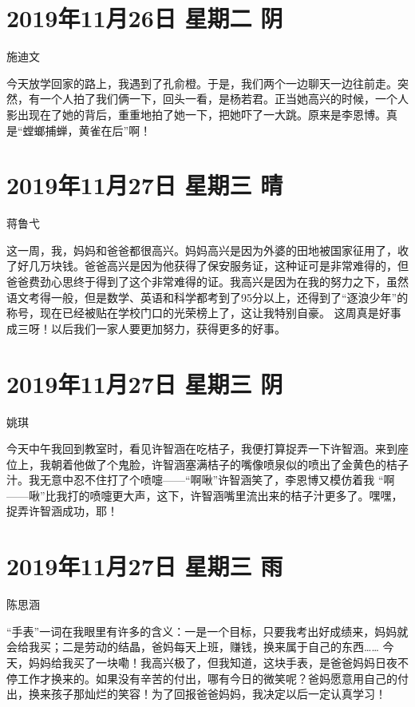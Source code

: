 \section{2019年11月26日 星期二 阴}

施迪文

今天放学回家的路上，我遇到了孔俞橙。于是，我们两个一边聊天一边往前走。突然，有一个人拍了我们俩一下，回头一看，是杨若君。正当她高兴的时候，一个人影出现在了她的背后，重重地拍了她一下，把她吓了一大跳。原来是李恩博。真是“螳螂捕蝉，黄雀在后”啊！

\section{2019年11月27日 星期三 晴}

蒋鲁弋

这一周，我，妈妈和爸爸都很高兴。妈妈高兴是因为外婆的田地被国家征用了，收了好几万块钱。爸爸高兴是因为他获得了保安服务证，这种证可是非常难得的，但爸爸费劲心思终于得到了这个非常难得的证。我高兴是因为在我的努力之下，虽然语文考得一般，但是数学、英语和科学都考到了95分以上，还得到了“逐浪少年”的称号，现在已经被贴在学校门口的光荣榜上了，这让我特别自豪。
这周真是好事成三呀！以后我们一家人要更加努力，获得更多的好事。

\section{2019年11月27日 星期三 阴}

姚琪

今天中午我回到教室时，看见许智涵在吃桔子，我便打算捉弄一下许智涵。来到座位上，我朝着他做了个鬼脸，许智涵塞满桔子的嘴像喷泉似的喷出了金黄色的桔子汁。我无意中忍不住打了个喷嚏——“啊啾”许智涵笑了，李恩博又模仿着我
“啊——啾”比我打的喷嚏更大声，这下，许智涵嘴里流出来的桔子汁更多了。嘿嘿，捉弄许智涵成功，耶！

\section{2019年11月27日 星期三 雨}

陈思涵

“手表”一词在我眼里有许多的含义：一是一个目标，只要我考出好成绩来，妈妈就会给我买；二是劳动的结晶，爸妈每天上班，赚钱，换来属于自己的东西…… 今天，妈妈给我买了一块嘞！我高兴极了，但我知道，这块手表，是爸爸妈妈日夜不停工作才换来的。如果没有辛苦的付出，哪有今日的微笑呢？爸妈愿意用自己的付出，换来孩子那灿烂的笑容！为了回报爸爸妈妈，我决定以后一定认真学习！

